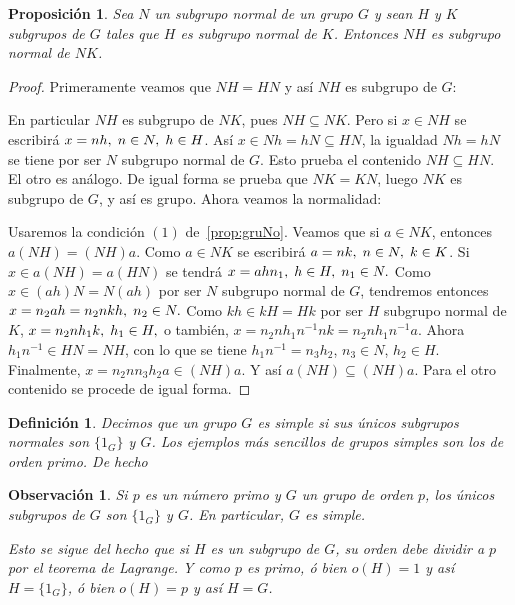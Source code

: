 \documentclass[12pt]{article}
\newtheorem{proposition}[theorem]{Proposición}
\newtheorem{definition}[theorem]{Definición}
\newtheorem{observation}{Observación}[theorem]
\begin{document}
\begin{proposition}\label{eq:nhnormal} Sea $N$ un subgrupo normal de un grupo $G$ y sean $H$ y $K$ subgrupos de $G$ tales que $H$ es subgrupo normal de $K$. Entonces $NH$ es subgrupo normal de $NK$.
\end{proposition}
\begin{proof}
Primeramente veamos que $NH=HN$ y así $NH$ es subgrupo de $G$:

En particular $NH$ es subgrupo de $NK$, pues $NH \subseteq NK$. Pero si $x \in NH$ se escribirá $x = nh, \hspace{0.1cm} n \in N, \hspace{0.1cm} h \in H$. Así $x \in Nh = hN \subseteq HN$, la igualdad $Nh = hN$ se tiene por ser $N$ subgrupo normal de $G$. Esto prueba el contenido $NH \subseteq HN$. El otro es análogo. De igual forma se prueba que $NK = KN$, luego $NK$ es subgrupo de $G$, y así es grupo. Ahora veamos la normalidad:

Usaremos la condición $(1)$ de~\ref{prop:gruNo}. Veamos que si $a \in NK$, entonces $a(NH) = (NH)a$. Como $a \in NK$ se escribirá $a = nk, \hspace{0.1cm} n \in N, \hspace{0.1cm} k \in K$. Si $x \in a(NH) = a(HN)$ se tendrá $x = ahn_{1}, \hspace{0.1cm} h \in H, \hspace{0.1cm} n_{1} \in N.$ Como $x \in (ah)N = N(ah)$ por ser $N$ subgrupo normal de $G$, tendremos entonces $x = n_{2}ah = n_{2}nkh, \hspace{0.1cm} n_{2} \in N.$ Como $kh \in kH = Hk$ por ser $H$ subgrupo normal de $K$, $x = n_{2}nh_{1}k, \hspace{0.1cm} h_{1} \in H,$ o también, $x = n_{2}nh_{1}n^{-1}nk = n_{2}nh_{1}n^{-1}a$. Ahora $h_{1}n^{-1} \in HN = NH$, con lo que se tiene $h_{1}n^{-1} = n_{3}h_{2}$, $n_{3} \in N$, $h_{2} \in H$. Finalmente, $x = n_{2}nn_{3}h_{2}a \in (NH)a$. Y así $a(NH) \subseteq (NH)a$. Para el otro contenido se procede de igual forma.

\end{proof}

\begin{definition}Decimos que un grupo $G$ es simple si sus únicos subgrupos normales son $\lbrace 1_G \rbrace$ y $G$. Los ejemplos más sencillos de grupos simples son los de orden primo. De hecho
\end{definition}

\begin{observation}Si $p$ es un número primo y $G$ un grupo de orden $p$, los únicos subgrupos de $G$ son $\lbrace 1_{G}\rbrace$ y $G$. En particular, $G$ es simple.

Esto se sigue del hecho que si $H$ es un subgrupo de $G$, su orden debe dividir a $p$ por el teorema de Lagrange. Y como $p$ es primo, ó bien $o(H) = 1$ y así $H = \lbrace 1_{G}\rbrace$, ó bien $o(H) = p$ y así $H = G$.
\end{observation}
\end{document}
